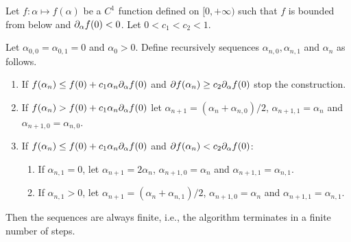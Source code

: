 \begin{proposition}
\label{prop:weak.wolfe.alg}
Let $f: \alpha \mapsto f(\alpha)$ be a $C^1$ function defined on $[0, +\infty)$ such that $f$ is bounded from below and $\partial_\alpha f(0) < 0$. Let $0 < c_1 < c_2 < 1$. 

Let $\alpha_{0,0} = \alpha_{0,1} = 0$ and $\alpha_0 > 0$. Define recursively sequences $\alpha_{n,0}, \alpha_{n,1}$ and $\alpha_{n}$ as follows. 
\begin{enumerate}[label=(\roman*)]
\item If  $f(\alpha_n) \leq  f(0) + c_1\alpha_n \partial_\alpha f(0)$ and  $\partial f(\alpha_n) \geq c_2 \partial_\alpha f(0)$ stop the construction.
\item If $f(\alpha_n) >  f(0) + c_1\alpha_n \partial_\alpha f(0)$ 
let $\alpha_{n+1} = (\alpha_n+\alpha_{n,0})/2$, $\alpha_{n+1,1} = \alpha_{n}$ and $\alpha_{n+1,0} = \alpha_{n,0}$.
\item If $f(\alpha_n) \leq  f(0) + c_1\alpha_n \partial_\alpha f(0)$ and $\partial f(\alpha_n) < c_2 \partial_\alpha f(0)$:
\begin{enumerate}[label = (\alph*),itemindent=1cm]
\item If $\alpha_{n,1}=0$, let  $\alpha_{n+1} = 2\alpha_n$, $\alpha_{n+1,0} = \alpha_{n}$ and $\alpha_{n+1,1} = \alpha_{n,1}$.
\item If $\alpha_{n,1}>0$,  let 
$\alpha_{n+1} = (\alpha_n+\alpha_{n,1})/2$, $\alpha_{n+1,0} = \alpha_{n}$ and $\alpha_{n+1,1} = \alpha_{n,1}$.
\end{enumerate}
%
\end{enumerate}
Then the sequences are always finite, i.e., the algorithm terminates in a finite number of steps.
\end{proposition}  

